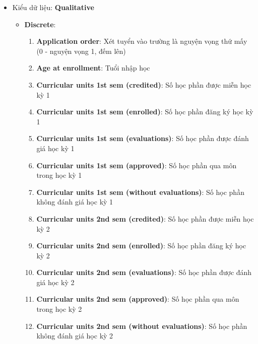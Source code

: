 \begin{itemize}
        \item Kiểu dữ liệu: \textbf{Qualitative} 
        \begin{itemize}
            \item \textbf{Discrete}:
                \begin{enumerate}[resume]
                    \item \textbf{Application order}: Xét tuyển vào trường là nguyện vọng thứ mấy (0 - nguyện vọng 1, đếm lên)
    
                    \item \textbf{Age at enrollment}: Tuổi nhập học
    
                    \item \textbf{Curricular units 1st sem (credited)}: Số học phần được miễn học kỳ 1
                    
                    \item \textbf{Curricular units 1st sem (enrolled)}: Số học phần đăng ký học kỳ 1
                    
                    \item \textbf{Curricular units 1st sem (evaluations)}: Số học phần được đánh giá học kỳ 1
                    
                    \item \textbf{Curricular units 1st sem (approved)}: Số học phần qua môn trong học kỳ 1
                    
                    \item \textbf{Curricular units 1st sem (without evaluations)}: Số học phần không đánh giá học kỳ 1
                    
                    \item \textbf{Curricular units 2nd sem (credited)}: Số học phần được miễn học kỳ 2
                    
                    \item \textbf{Curricular units 2nd sem (enrolled)}: Số học phần đăng ký học kỳ 2
                    
                    \item \textbf{Curricular units 2nd sem (evaluations)}: Số học phần được đánh giá học kỳ 2
                    
                    \item \textbf{Curricular units 2nd sem (approved)}: Số học phần qua môn trong học kỳ 2
                    
                    \item \textbf{Curricular units 2nd sem (without evaluations)}: Số học phần không đánh giá học kỳ 2
                \end{enumerate}


\end{itemize}
\end{itemize}
